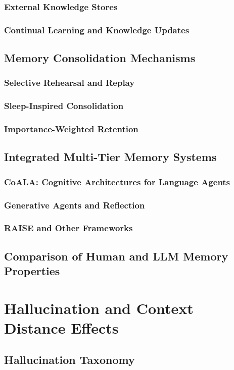 \documentclass[12pt, letterpaper]{article}
\begin{document}
\subsubsection{External Knowledge Stores}
\subsubsection{Continual Learning and Knowledge Updates}
\subsection{Memory Consolidation Mechanisms}
\subsubsection{Selective Rehearsal and Replay}
\subsubsection{Sleep-Inspired Consolidation}
\subsubsection{Importance-Weighted Retention}
\subsection{Integrated Multi-Tier Memory Systems}
\subsubsection{CoALA: Cognitive Architectures for Language Agents}
\subsubsection{Generative Agents and Reflection}
\subsubsection{RAISE and Other Frameworks}
\subsection{Comparison of Human and LLM Memory Properties}

\section{Hallucination and Context Distance Effects}
\subsection{Hallucination Taxonomy}
\end{document}
